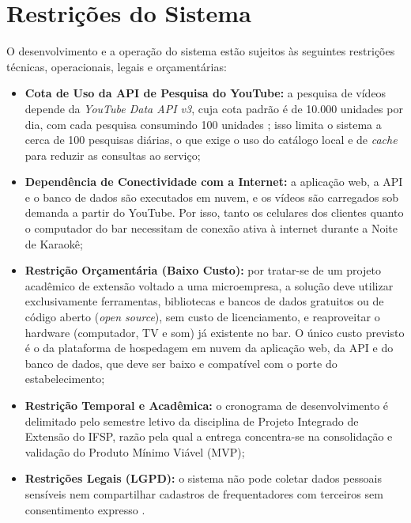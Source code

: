 \section{Restrições do Sistema} \label{sec:restricoes}

O desenvolvimento e a operação do sistema estão sujeitos às seguintes restrições técnicas, operacionais, legais e orçamentárias:

\begin{itemize}
  \item \textbf{Cota de Uso da API de Pesquisa do YouTube:} a pesquisa de vídeos depende da \textit{YouTube Data API v3}, cuja cota padrão é de 10.000 unidades por dia, com cada pesquisa consumindo 100 unidades \cite{youtubedataapi2026}; isso limita o sistema a cerca de 100 pesquisas diárias, o que exige o uso do catálogo local e de \textit{cache} para reduzir as consultas ao serviço;
  \item \textbf{Dependência de Conectividade com a Internet:} a aplicação web, a API e o banco de dados são executados em nuvem, e os vídeos são carregados sob demanda a partir do YouTube. Por isso, tanto os celulares dos clientes quanto o computador do bar necessitam de conexão ativa à internet durante a Noite de Karaokê;
  \item \textbf{Restrição Orçamentária (Baixo Custo):} por tratar-se de um projeto acadêmico de extensão voltado a uma microempresa, a solução deve utilizar exclusivamente ferramentas, bibliotecas e bancos de dados gratuitos ou de código aberto (\textit{open source}), sem custo de licenciamento, e reaproveitar o hardware (computador, TV e som) já existente no bar. O único custo previsto é o da plataforma de hospedagem em nuvem da aplicação web, da API e do banco de dados, que deve ser baixo e compatível com o porte do estabelecimento;
  \item \textbf{Restrição Temporal e Acadêmica:} o cronograma de desenvolvimento é delimitado pelo semestre letivo da disciplina de Projeto Integrado de Extensão do IFSP, razão pela qual a entrega concentra-se na consolidação e validação do Produto Mínimo Viável (MVP);
  \item \textbf{Restrições Legais (LGPD):} o sistema não pode coletar dados pessoais sensíveis nem compartilhar cadastros de frequentadores com terceiros sem consentimento expresso \cite{brasil2018lgpd}.
\end{itemize}

